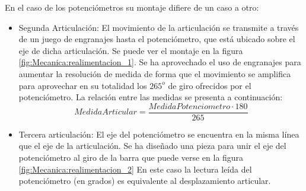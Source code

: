     En el caso de los potenciómetros su montaje difiere de un caso a otro:
    \begin{itemize}
        \item Segunda Articulación: El movimiento de la articulación se transmite a través de un juego de engranajes hasta el potenciómetro, que está ubicado sobre el eje de dicha articulación. Se puede ver el montaje en la figura \ref{fig:Mecanica:realimentacion_1}. Se ha aprovechado el uso de engranajes para aumentar la resolución de medida de forma que el movimiento se amplifica para aprovechar en su totalidad los $265^o$ de giro ofrecidos por el potenciómetro. La relación entre las medidas se presenta a continuación:
        \begin{equation}
        	Medida Articular = \frac{Medida Potenciometro \cdot 180}{265}
        \end{equation}
        \item Tercera articulación: El eje del potenciómetro se encuentra en la misma línea que el eje de la articulación. Se ha diseñado una pieza para unir el eje del potenciómetro al giro de la barra que puede verse en la figura \ref{fig:Mecanica:realimentacion_2} En este caso la lectura leída del potenciómetro (en grados) es equivalente al desplazamiento articular.
    \end{itemize}

